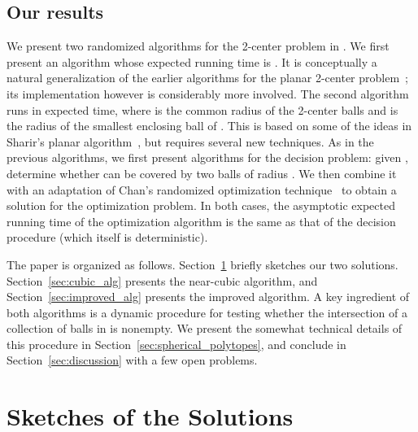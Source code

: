 \documentclass[a4paper,12pt]{article}
\begin{document}
\subsection{Our results}
\label{subsec:results} We present two randomized algorithms for the
2-center problem in . We first present an algorithm whose
expected running time is . It is conceptually a
natural generalization of the earlier algorithms for the planar
2-center problem~\cite{ASP, DE, JK}; its implementation however is
considerably more involved. The second algorithm runs in  expected time, where  is the common
radius of the 2-center balls and  is the radius of the smallest
enclosing ball of .  This is based on some of the ideas in
Sharir's planar algorithm~\cite{MS}, but requires several new
techniques. As in the previous algorithms, we first present
algorithms for the decision problem: given , determine
whether  can be covered by two balls of radius . We then
combine it with an adaptation of Chan's randomized optimization
technique~\cite{TCG} to obtain a solution for the optimization
problem. In both cases, the asymptotic expected running time of the
optimization algorithm is the same as that of the decision procedure
(which itself is deterministic).

The paper is organized as follows. Section~\ref{sec:sketches}
briefly sketches our two solutions. Section~\ref{sec:cubic_alg}
presents the near-cubic algorithm, and
Section~\ref{sec:improved_alg} presents the improved algorithm. A
key ingredient of both algorithms is a dynamic procedure for testing
whether the intersection of a collection of balls in 
is nonempty. We present the somewhat technical details of this
procedure in Section~\ref{sec:spherical_polytopes}, and conclude in
Section~\ref{sec:discussion} with a few open problems.

\section{Sketches of the Solutions}
\label{sec:sketches}
\end{document}
